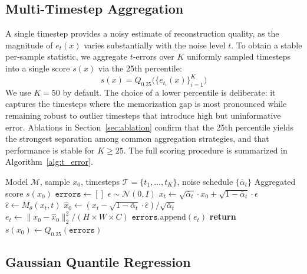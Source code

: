 \documentclass[sigconf, review, anonymous]{acmart}
\begin{document}
\subsection{Multi-Timestep Aggregation}
\label{sec:aggregation}

A single timestep provides a noisy estimate of reconstruction quality, as the magnitude of $e_t(x)$ varies substantially with the noise level $t$. To obtain a stable per-sample statistic, we aggregate $t$-errors over $K$ uniformly sampled timesteps into a single score $s(x)$ via the 25th percentile:
\begin{equation}
  s(x) = Q_{0.25}\!\bigl(\{e_{t_i}(x)\}_{i=1}^{K}\bigr)
\end{equation}
We use $K{=}50$ by default. The choice of a lower percentile is deliberate: it captures the timesteps where the memorization gap is most pronounced while remaining robust to outlier timesteps that introduce high but uninformative error. Ablations in Section~\ref{sec:ablation} confirm that the 25th percentile yields the strongest separation among common aggregation strategies, and that performance is stable for $K \geq 25$. The full scoring procedure is summarized in Algorithm~\ref{alg:t_error}.

\begin{algorithm}[t]
\caption{$t$-error Computation}
\label{alg:t_error}
\begin{algorithmic}
\REQUIRE Model $\mathcal{M}$, sample $x_0$, timesteps $\mathcal{T} = \{t_1, \ldots, t_K\}$, noise schedule $\{\bar{\alpha}_t\}$
\ENSURE Aggregated score $s(x_0)$
\STATE $\texttt{errors} \leftarrow []$
    \STATE $\epsilon \sim \mathcal{N}(0, I)$
    \STATE $x_t \leftarrow \sqrt{\bar{\alpha}_t} \cdot x_0 + \sqrt{1 - \bar{\alpha}_t} \cdot \epsilon$
    \STATE $\hat{\epsilon} \leftarrow M_\theta(x_t, t)$
    \STATE $\hat{x}_0 \leftarrow (x_t - \sqrt{1 - \bar{\alpha}_t} \cdot \hat{\epsilon}) / \sqrt{\bar{\alpha}_t}$
    \STATE $e_t \leftarrow \|x_0 - \hat{x}_0\|_2^2 / (H \times W \times C)$
    \STATE $\texttt{errors}.\text{append}(e_t)$
\ENDFOR
\STATE \textbf{return} $s(x_0) \leftarrow Q_{0.25}(\texttt{errors})$
\end{algorithmic}
\end{algorithm}

\subsection{Gaussian Quantile Regression}
\label{sec:gaussian_qr}
\end{document}
